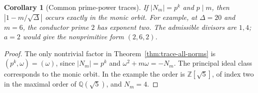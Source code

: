 \documentclass[11pt]{amsart}
\newtheorem{corollary}[theorem]{Corollary}
\theoremstyle{definition}
\theoremstyle{remark}
\numberwithin{equation}{section}
\newcommand{\Q}{\mathbb{Q}}
\newcommand{\Z}{\mathbb{Z}}
\begin{document}
\begin{corollary}[Common prime-power traces]
\label{cor:common-prime-power}
If $|N_m|=p^k$ and $p\mid m$, then $|1-m/\sqrt\Delta|$ occurs
exactly in the monic orbit. For example, at $\Delta=20$ and $m=6$,
the conductor prime $2$ has exponent two. The admissible divisors
are $1,4$; $a=2$ would give the nonprimitive form $(2,6,2)$.
\end{corollary}
\begin{proof}
The only nontrivial factor in Theorem~\ref{thm:trace-all-norms}
is $(p^k,\omega)=(\omega)$, since $|N_m|=p^k$ and
$\omega^2+m\omega=-N_m$. The principal ideal class corresponds
to the monic orbit. In the example the order is
$\Z[\sqrt5]$, of index two in the maximal order of
$\Q(\sqrt5)$, and $N_m=4$.
\end{proof}
\end{document}
